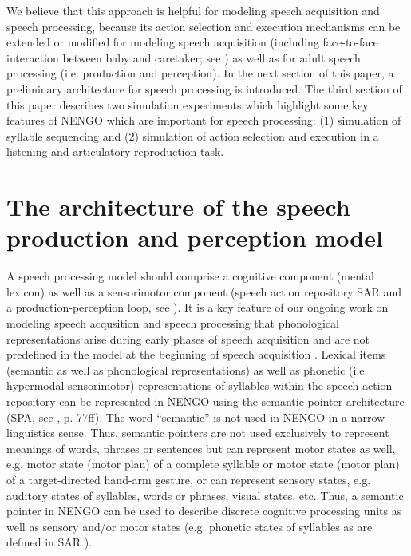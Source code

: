 \documentclass[conference]{IEEEtran}
\begin{document}
We believe that this approach is helpful for modeling speech
acquisition and speech processing, because its action selection and
execution mechanisms can be extended or modified for modeling speech
acquisition (including face-to-face interaction between baby and
caretaker; see \cite{kroger2011}) as well as for adult speech
processing (i.e. production and perception). In the next section of
this paper, a preliminary architecture for speech processing is
introduced. The third section of this paper describes two simulation
experiments which highlight some key features of NENGO which are
important for speech processing: (1) simulation of syllable sequencing
and (2) simulation of action selection and execution in a listening
and articulatory reproduction task.

\section{The architecture of the speech production and perception
  model}

A speech processing model should comprise a cognitive component
(mental lexicon) as well as a sensorimotor component (speech action
repository SAR and a production-perception loop, see
\cite{kroger2009,kroger2014,kroger2012,kroger2011a,eckers2013,eckers2013a,kroger2010}).
It is a key feature of our ongoing work on modeling speech acqusition
and speech processing that phonological representations arise during
early phases of speech acquisition and are not predefined in the model
at the beginning of speech acquisition
\cite{kroger2009,kroger2014,kroger2011}. Lexical items (semantic as
well as phonological representations) as well as phonetic (i.e.
hypermodal sensorimotor) representations of syllables within the
speech action repository
\cite{kroger2012,kroger2011a,eckers2013,eckers2013a,kroger2010} can be
represented in NENGO using the semantic pointer architecture (SPA, see
\cite{eliasmith2013}, p. 77ff). The word ``semantic'' is not used in
NENGO in a narrow linguistics sense. Thus, semantic pointers are not
used exclusively to represent meanings of words, phrases or sentences
but can represent motor states as well, e.g. motor state (motor plan)
of a complete syllable or motor state (motor plan) of a
target-directed hand-arm gesture, or can represent sensory states,
e.g. auditory states of syllables, words or phrases, visual states,
etc. Thus, a semantic pointer in NENGO can be used to describe
discrete cognitive processing units as well as sensory and/or motor
states (e.g. phonetic states of syllables as are defined in SAR
\cite{kroger2012,kroger2011a,eckers2013,eckers2013a,kroger2010}).
\end{document}
